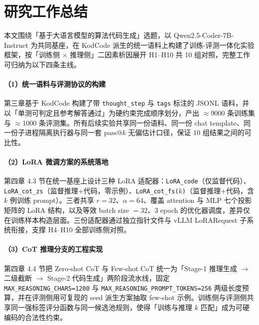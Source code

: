 \section{研究工作总结}

本文围绕「基于大语言模型的算法代码生成」选题，以 Qwen2.5-Coder-7B-Instruct 为共同基座，在 KodCode 派生的统一语料上构建了训练-评测一体化实验框架，按「训练侧 $\times$ 推理侧」二因素析因展开 H1--H10 共 10 组对照，完整工作可归纳为以下四条主线。

\paragraph{（1）统一语料与评测协议的构建}
第三章基于 KodCode 构建了带 \texttt{thought\_step} 与 \texttt{tags} 标注的 JSONL 语料，并以「单测可判定且参考解答通过」为硬约束完成顺序划分，产出 $\approx$9000 条训练集与 $\approx$1000 条评测集。所有后续实验共享同一份语料、同一份 chat template、同一份子进程隔离执行器与同一套 pass@$k$ 无偏估计口径，保证 10 组结果之间的可比性。

\paragraph{（2）LoRA 微调方案的系统落地}
第四章 4.3 节在统一基座上设计三种 LoRA 适配器：\texttt{LoRA\_code}（仅监督代码）、\texttt{LoRA\_cot\_zs}（监督推理+代码，零示例）、\texttt{LoRA\_cot\_fs($k$)}（监督推理+代码，含 $k$ 例训练 prompt）。三者共享 $r{=}32$、$\alpha{=}64$、覆盖 attention 与 MLP 七个投影矩阵的 LoRA 结构，以及等效 batch size $=32$、3 epoch 的优化器调度，差异仅在训练样本构造层面。三份适配器通过独立指针文件与 vLLM LoRARequest 子系统衔接，支撑 H4--H10 全部训练侧对照。

\paragraph{（3）CoT 推理分支的工程实现}
第四章 4.4 节把 Zero-shot CoT 与 Few-shot CoT 统一为「Stage-1 推理生成 $\to$ 二级截断 $\to$ Stage-2 代码生成」两阶段流水线，固定 \texttt{MAX\_REASONING\_CHARS=1200} 与 \texttt{MAX\_REASONING\_PROMPT\_TOKENS=256} 两级长度预算，并在评测侧用可复现的 seed 派生方案抽取 few-shot 示例。训练侧与评测侧共享同一强标签评分函数与同一候选池规则，使得「训练与推理 $k$ 匹配」成为可硬编码的合法性约束。

